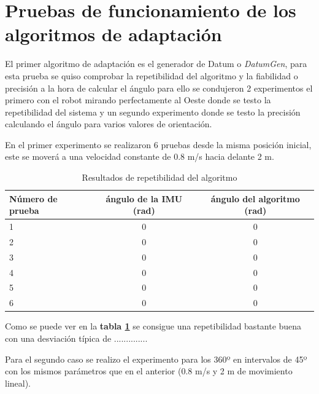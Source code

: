 \section{Pruebas de funcionamiento de los algoritmos de adaptación}
El primer algoritmo de adaptación es el generador de Datum o \textit{DatumGen}, para esta prueba se quiso comprobar la repetibilidad del algoritmo y 
la fiabilidad o precisión a la hora de calcular el ángulo para ello se condujeron 2 experimentos el primero con el robot mirando perfectamente al Oeste donde se testo la 
repetibilidad del sistema y un segundo experimento donde se testo la precisión calculando el ángulo para varios valores de orientación.

En el primer experimento se realizaron 6 pruebas desde la misma posición inicial, este se moverá a una velocidad constante de 0.8 m/s hacia delante 2 m.
\begin{table}[h!]
    \centering
    \caption{Resultados de repetibilidad del algoritmo}
    \begin{tabular}{|l|c|c|}
        \hline
        Número de prueba     & ángulo de la IMU (rad) & ángulo del algoritmo (rad)     \\ \hline
        1           & 0 & 0 \\ \hline
        2           & 0 & 0  \\ \hline
        3           & 0 & 0  \\ \hline
        4           & 0 & 0  \\ \hline
        5           & 0 & 0  \\ \hline
        6            & 0 & 0  \\ \hline
    \end{tabular}
    \label{tab:repetibilidad_datumgen}
\end{table}

Como se puede ver en la \textbf{tabla \ref{tab:repetibilidad_datumgen}} se consigue una repetibilidad bastante buena con una desviación 
típica de ..............

Para el segundo caso se realizo el experimento para los 360º en intervalos de 45º con los mismos parámetros que en el anterior (0.8 m/s y 2 m de movimiento lineal).

